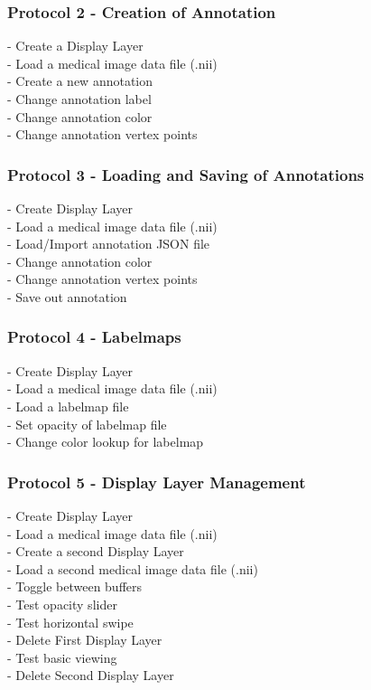 \documentclass[a4paper,11pt,titlepage]{article}
\begin{document}
\subsubsection*{Protocol 2 - Creation of Annotation }

- Create a Display Layer\\
- Load a medical image data file (.nii)\\
- Create a new annotation\\
- Change annotation label\\
- Change annotation color\\
- Change annotation vertex points

\subsubsection*{Protocol 3 - Loading and Saving of Annotations }

- Create Display Layer\\
- Load a medical image data file (.nii)\\
- Load/Import annotation JSON file\\
- Change annotation color\\
- Change annotation vertex points\\
- Save out annotation


\subsubsection*{Protocol 4 - Labelmaps }

- Create Display Layer\\
- Load a medical image data file (.nii)\\
- Load a labelmap file\\
- Set opacity of labelmap file\\
- Change color lookup for labelmap

\subsubsection*{Protocol 5 - Display Layer Management }

- Create Display Layer\\
- Load a medical image data file (.nii)\\
- Create a second Display Layer\\
- Load a second medical image data file (.nii)\\
- Toggle between buffers\\
- Test opacity slider\\
- Test horizontal swipe\\
- Delete First Display Layer\\
- Test basic viewing\\
- Delete Second Display Layer
\end{document}
